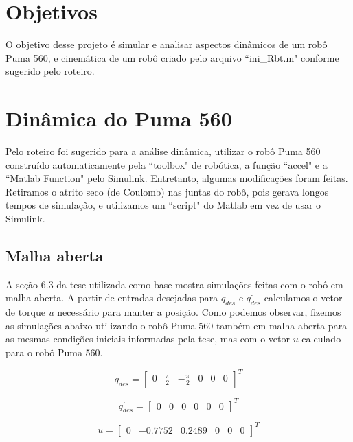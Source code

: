 \documentclass{article}
\begin{document}


\onehalfspacing
\section{Objetivos} 
O objetivo desse projeto é simular e analisar aspectos dinâmicos de um robô Puma 560, e cinemática de um robô criado pelo arquivo ``ini\_Rbt.m"\cite{bb:inirbt} conforme sugerido pelo roteiro\cite{bb:roteiro}. 
	
\section{Dinâmica do Puma 560}
Pelo roteiro foi sugerido para a análise dinâmica, utilizar o robô Puma 560 construído automaticamente pela ``toolbox" de robótica\cite{bb:toolbox}, a função ``accel" e a ``Matlab Function" pelo Simulink. Entretanto, algumas modificações foram feitas. Retiramos o atrito seco (de Coulomb) nas juntas do robô, pois gerava longos tempos de simulação, e utilizamos um ``script" do Matlab em vez de usar o Simulink.

\subsection{Malha aberta}
A seção 6.3 da tese\cite{bb:tese} utilizada como base mostra simulações feitas com o robô em malha aberta. A partir de entradas desejadas para $q_{des}$ e $\dot{q_{des}}$ calculamos o vetor de torque $u$ necessário para manter a posição. Como podemos observar, fizemos as simulações abaixo utilizando o robô Puma 560 também em malha aberta para as mesmas condições iniciais informadas pela tese\cite{bb:tese}, mas com o vetor $u$ calculado para o robô Puma 560.

\begin{equation}
\label{eq:qdesejado}
q_{des}=\begin{bmatrix}
0 & \frac{\pi}{2} & -\frac{\pi}{2} & 0 & 0 & 0
\end{bmatrix}^T
\end{equation}

\begin{equation}
\label{eq:qddesejado}
\dot{q_{des}}=\begin{bmatrix}
0 & 0 & 0 & 0 & 0 & 0
\end{bmatrix}^T
\end{equation}

\begin{equation}
\label{eq:torques}
u=\begin{bmatrix}
0 & -0.7752 & 0.2489 & 0 & 0 & 0
\end{bmatrix}^T
\end{equation}
\end{document}
